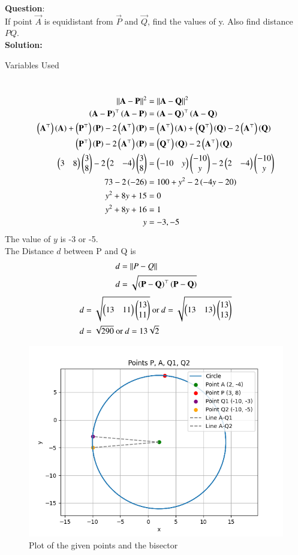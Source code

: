 \documentclass[journal]{IEEEtran}
\begin{document}
\textbf{Question}:\\
If point $\vec{A}$ is equidistant from $\vec{P}$ and $\vec{Q}$, find the values of y. Also find distance $PQ$. 
\\
\textbf{Solution: }
\begin{table}[h!]    
  \centering
  
  \caption{Variables Used}
  \label{tab10.5.3.9.1}
\end{table}\\
\begin{align}
\left\lVert\mathbf{A}-\mathbf{P}\right\rVert^2&=\left\lVert\mathbf{A}-\mathbf{Q}\right\rVert^2\\
	\left(\mathbf{A}-\mathbf{P}\right)^\top\left(\mathbf{A}-\mathbf{P}\right)&=\left(\mathbf{A}-\mathbf{Q}\right)^\top\left(\mathbf{A}-\mathbf{Q}\right)\\
	\left(\mathbf{A}^\top\right)\left(\mathbf{A}\right)+\left(\mathbf{P}^\top\right)\left(\mathbf{P}\right)-2\left(\mathbf{A}^\top\right)\left(\mathbf{P}\right)&=\left(\mathbf{A}^\top\right)\left(\mathbf{A}\right)+\left(\mathbf{Q}^\top\right)\left(\mathbf{Q}\right)-2\left(\mathbf{A}^\top\right)\left(\mathbf{Q}\right)\\
	\left(\mathbf{P}^\top\right)\left(\mathbf{P}\right)-2\left(\mathbf{A}^\top\right)\left(\mathbf{P}\right)&=\left(\mathbf{Q}^\top\right)\left(\mathbf{Q}\right)-2\left(\mathbf{A}^\top\right)\left(\mathbf{Q}\right)\\
\begin{pmatrix}3&8\end{pmatrix}\begin{pmatrix}3\\8\end{pmatrix}-2\begin{pmatrix}2&-4\end{pmatrix}\begin{pmatrix}3\\8\end{pmatrix}&=\begin{pmatrix}-10&y\end{pmatrix}\begin{pmatrix}-10\\y\end{pmatrix}-2\begin{pmatrix}2&-4\end{pmatrix}\begin{pmatrix}-10\\y\end{pmatrix}\\
73-2\left(-26\right)&=100+y^2-2\left(-4y-20\right)\\
y^2+8y+15&=0\\
y^2+8y+16&=1\\
y&=-3,-5
\end{align}
The value of $y$ is -3 or -5.\\
The Distance $d$ between P and Q is 
\begin{align}
	d&=\left\lVert P-Q\right\rVert\\
	d&=\sqrt{\left(\mathbf{P-Q}\right)^\top\left(\mathbf{P-Q}\right)}\\
\end{align}
\begin{align}
d&=\sqrt{\begin{pmatrix}13&11\end{pmatrix}\begin{pmatrix}13\\11\end{pmatrix}}\text{ or }d=\sqrt{\begin{pmatrix}13&13\end{pmatrix}\begin{pmatrix}13\\13\end{pmatrix}}\\
	d&=\sqrt{290}\text{ or }d=13\sqrt{2}
\end{align}

\begin{figure}[h!]
   \centering
   \includegraphics[width=0.7\linewidth]{figs/fig.png}
   \caption{Plot of the given points and the bisector}
   \label{stemplot}
\end{figure}  
\end{document}
